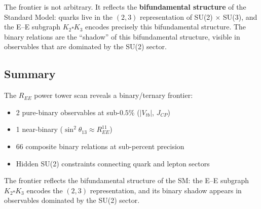 The frontier is not arbitrary. It reflects the \textbf{bifundamental structure} of the Standard Model: quarks live in the $(2, 3)$ representation of SU(2) $\times$ SU(3), and the E--E subgraph $K_2 \square K_3$ encodes precisely this bifundamental structure. The binary relations are the ``shadow'' of this bifundamental structure, visible in observables that are dominated by the SU(2) sector.

\subsection{Summary}\label{sec:binary_summary}

The $R_{EE}$ power tower scan reveals a binary/ternary frontier:
\begin{itemize}
\item 2 pure-binary observables at sub-$0.5\%$ ($|V_{tb}|$, $J_{CP}$)
\item 1 near-binary ($\sin^2\theta_{13} \approx R_{EE}^{11}$)
\item 66 composite binary relations at sub-percent precision
\item Hidden SU(2) constraints connecting quark and lepton sectors
\end{itemize}

The frontier reflects the bifundamental structure of the SM: the E--E subgraph $K_2 \square K_3$ encodes the $(2, 3)$ representation, and its binary shadow appears in observables dominated by the SU(2) sector.
